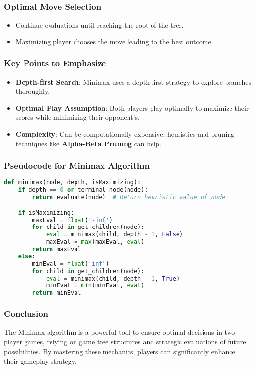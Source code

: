 \documentclass[aspectratio=169]{beamer}
\begin{document}
\begin{frame}[fragile]
    \frametitle{Optimal Move Selection}
    \begin{itemize}
        \item Continue evaluations until reaching the root of the tree.
        \item Maximizing player chooses the move leading to the best outcome.
    \end{itemize}
\end{frame}

\begin{frame}
    \frametitle{Key Points to Emphasize}
    \begin{itemize}
        \item \textbf{Depth-first Search}: Minimax uses a depth-first strategy to explore branches thoroughly.
        \item \textbf{Optimal Play Assumption}: Both players play optimally to maximize their scores while minimizing their opponent's.
        \item \textbf{Complexity}: Can be computationally expensive; heuristics and pruning techniques like \textbf{Alpha-Beta Pruning} can help.
    \end{itemize}
\end{frame}

\begin{frame}[fragile]
    \frametitle{Pseudocode for Minimax Algorithm}
    \begin{lstlisting}[language=Python]
def minimax(node, depth, isMaximizing):
    if depth == 0 or terminal_node(node):
        return evaluate(node)  # Return heuristic value of node

    if isMaximizing:
        maxEval = float('-inf')
        for child in get_children(node):
            eval = minimax(child, depth - 1, False)
            maxEval = max(maxEval, eval)
        return maxEval
    else:
        minEval = float('inf')
        for child in get_children(node):
            eval = minimax(child, depth - 1, True)
            minEval = min(minEval, eval)
        return minEval
    \end{lstlisting}
\end{frame}

\begin{frame}
    \frametitle{Conclusion}
    The Minimax algorithm is a powerful tool to ensure optimal decisions in two-player games, relying on game tree structures and strategic evaluations of future possibilities. By mastering these mechanics, players can significantly enhance their gameplay strategy.
\end{frame}
\end{document}
